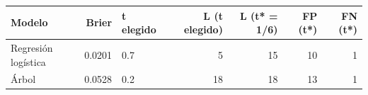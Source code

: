 \begin{tabular}{lrlrrrr}
\toprule
Modelo & Brier & t elegido & L (t elegido) & L (t* = 1/6) & FP (t*) & FN (t*) \\
\midrule
Regresión logística & 0.0201 & 0.7 & 5 & 15 & 10 & 1 \\
Árbol & 0.0528 & 0.2 & 18 & 18 & 13 & 1 \\
\bottomrule
\end{tabular}
